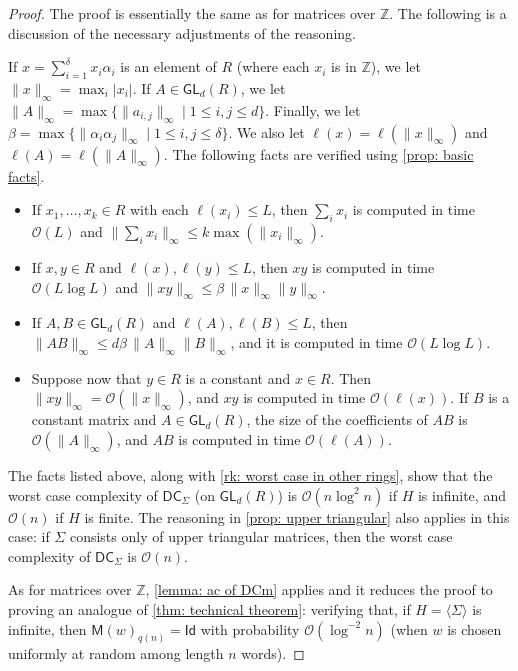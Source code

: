 \documentclass{article}
\def\Id{\textsf{Id}}
\def\O{\mathcal{O}}
\def\Z{\mathbb{Z}}
\def\GL{\textsf{GL}}
\def\DC{\textsf{DC}}
\def\mat{\textsf{M}}
\theoremstyle{plain}
\theoremstyle{definition}
\begin{document}
\begin{proof}
%
The proof is essentially the same as for matrices over $\Z$. The following is a discussion of the necessary adjustments of the reasoning.

If $x = \sum_{i=1}^\delta x_i\alpha_i$ is an element of $R$ (where each $x_i$ is in $\Z$), we let $\|x\|_\infty = \max_i|x_i|$. If $A\in \GL_d(R)$, we let $\|A\|_\infty = \max\{\|a_{i,j}\|_\infty \mid 1\le i,j\le d\}$. Finally, we let $\beta = \max\{\|\alpha_i\alpha_j\|_\infty \mid 1\le i,j \le \delta\}$. We also let $\ell(x) = \ell(\|x\|_\infty)$ and $\ell(A) = \ell(\|A\|_\infty)$.
%
The following facts are verified using \cref{prop: basic facts}.
%
\begin{itemize}
    \item If $x_1,\dots, x_k \in R$ with each $\ell(x_i) \le L$, then $\sum_i x_i$ is computed in time $\O(L)$ and $\|\sum_ix_i\|_\infty \le k \max(\|x_i\|_\infty)$.

    \item If $x, y \in R$ and $\ell(x), \ell(y) \le L$, then $xy$ is computed in time $\O(L\log L)$ and $\|xy\|_\infty \le \beta\, \|x\|_\infty \|y\|_\infty$.

    \item If $A, B \in \GL_d(R)$ and $\ell(A), \ell(B) \le L$, then $\|AB\|_\infty \le d\beta\, \|A\|_\infty \|B\|_\infty$, and it is computed in time $\O(L\log L)$.

    \item Suppose now that $y \in R$ is a constant and $x\in R$. Then $\|xy\|_\infty = \O(\|x\|_\infty)$, and $xy$ is computed in time $\O(\ell(x))$. If $B$ is a constant matrix and $A \in \GL_d(R)$, the size of the coefficients of $AB$ is $\O(\|A\|_\infty)$, and $AB$ is computed in time $\O(\ell(A))$.
%
\end{itemize}

The facts listed above, along with \cref{rk: worst case in other rings}, show that the worst case complexity of $\DC_\Sigma$ (on $\GL_d(R)$) is $\O(n\log^2n)$ if $H$ is infinite, and $\O(n)$ if $H$ is finite. The reasoning in \cref{prop: upper triangular} also applies in this case: if $\Sigma$ consists only of upper triangular matrices, then the worst case complexity of $\DC_\Sigma$ is $\O(n)$.

As for matrices over $\Z$, \cref{lemma: ac of DCm} applies and it reduces the proof to proving an analogue of \cref{thm: technical theorem}: verifying that, if $H = \langle\Sigma\rangle$ is infinite, then $\mat(w)_{q(n)} = \Id$ with probability $\O(\log^{-2} n)$ (when $w$ is chosen uniformly at random among length $n$ words).


\end{proof}
\end{document}
